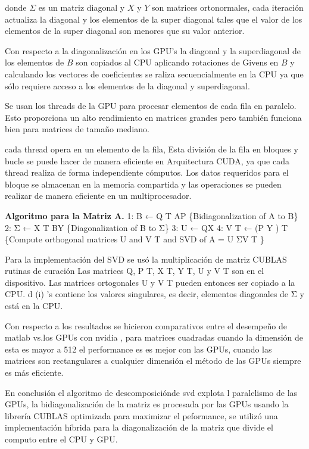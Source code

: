 \documentclass[]{article}
\begin{document}
donde \(\Sigma\) es un matriz diagonal y \(X\) y \(Y\) son matrices
ortonormales, cada iteración actualiza la diagonal y los elementos de la
super diagonal tales que el valor de los elementos de la super diagonal
son menores que su valor anterior.

Con respecto a la diagonalización en los GPU's la diagonal y la
superdiagonal de los elementos de \(B\) son copiados al CPU aplicando
rotaciones de Givens en \(B\) y calculando los vectores de coeficientes
se raliza secuencialmente en la CPU ya que sólo requiere acceso a los
elementos de la diagonal y superdiagonal.

Se usan los threads de la GPU para procesar elementos de cada fila en
paralelo. Esto proporciona un alto rendimiento en matrices grandes pero
también funciona bien para matrices de tamaño mediano.

cada thread opera en un elemento de la fila, Esta división de la fila en
bloques y bucle se puede hacer de manera eficiente en Arquitectura CUDA,
ya que cada thread realiza de forma independiente cómputos. Los datos
requeridos para el bloque se almacenan en la memoria compartida y las
operaciones se pueden realizar de manera eficiente en un
multiprocesador.

\textbf{Algoritmo para la Matriz A.} 1: B ← Q T AP \{Bidiagonalization
of A to B\} 2: Σ ← X T BY \{Diagonalization of B to Σ\} 3: U ← QX 4: V T
← (P Y ) T \{Compute orthogonal matrices U and V T and SVD of A = U ΣV T
\}

Para la implementación del SVD se usó la multiplicación de matriz CUBLAS
rutinas de curación Las matrices Q, P T, X T, Y T, U y V T son en el
dispositivo. Las matrices ortogonales U y V T pueden entonces ser
copiado a la CPU. d (i) 's contiene los valores singulares, es decir,
elementos diagonales de Σ y está en la CPU.

Con respecto a los resultados se hicieron comparativos entre el
desempeño de matlab vs.los GPUs con nvidia , para matrices cuadradas
cuando la dimensión de esta es mayor a 512 el performance es es mejor
con las GPUs, cuando las matrices son rectangulares a cualquier
dimensión el método de las GPUs siempre es más eficiente.

En conclusión el algoritmo de descomposiciónde svd explota l paralelismo
de las GPUs, la bidiagonalización de la matriz es procesada por las GPUs
usando la librería CUBLAS optimizada para maximizar el peformance, se
utilizó una implementación híbrida para la diagonalización de la matriz
que divide el computo entre el CPU y GPU.
\end{document}
